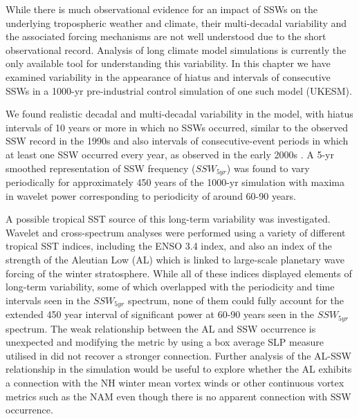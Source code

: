 While there is much observational evidence for an impact of SSWs on the underlying tropospheric weather and climate, their multi-decadal variability and the associated forcing mechanisms are not well understood due to the short observational record. Analysis of long climate model simulations is currently the only available tool for understanding this variability. In this chapter we have examined variability in the appearance of hiatus and intervals of consecutive SSWs in a 1000-yr pre-industrial control simulation of one such model (UKESM).

We found realistic decadal and multi-decadal variability in the model, with hiatus intervals of 10 years or more in which no SSWs occurred, similar to the observed SSW record in the 1990s \citep{Pawson1999, Shindell1999} and also intervals of consecutive-event periods in which at least one SSW occurred every year, as observed in the early 2000s \citep{Manney2005}. A 5-yr smoothed representation of SSW frequency ($SSW_{5yr}$) was found to vary periodically for approximately 450 years of the 1000-yr simulation with maxima in wavelet power corresponding to periodicity of around 60-90 years. 

A possible tropical SST source of this long-term variability was investigated. Wavelet and cross-spectrum analyses were performed using a variety of different tropical SST indices, including the ENSO 3.4 index, and also an index of the strength of the Aleutian Low (AL) which is linked to large-scale planetary wave forcing of the winter stratosphere. While all of these indices displayed elements of long-term variability, some of which overlapped with the periodicity and time intervals seen in the $SSW_{5yr}$ spectrum, none of them could fully account for the extended 450 year interval of significant power at 60-90 years seen in the $SSW_{5yr}$ spectrum. The weak relationship between the AL and SSW occurrence is unexpected and modifying the metric by using a box average SLP measure utilised in \cite{Garfinkel2012whymight} did not recover a stronger connection. Further analysis of the AL-SSW relationship in the simulation would be useful to explore whether the AL exhibits a connection with the NH winter mean vortex winds or other continuous vortex metrics such as the NAM even though there is no apparent connection with SSW occurrence. 

